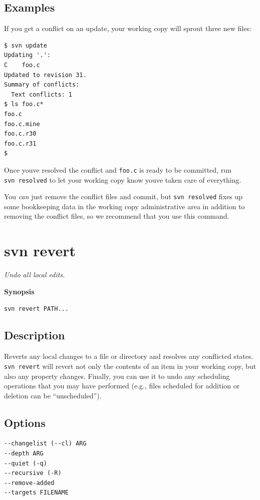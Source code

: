 \subsection{Examples}

If you get a conflict on an update, your working copy will sprout three
new files:

\begin{verbatim}
$ svn update
Updating '.':
C    foo.c
Updated to revision 31.
Summary of conflicts:
  Text conflicts: 1
$ ls foo.c*
foo.c
foo.c.mine
foo.c.r30
foo.c.r31
$
\end{verbatim}

Once you\textquotesingle ve resolved the conflict and \texttt{foo.c} is
ready to be committed, run \texttt{svn\ resolved} to let your working
copy know you\textquotesingle ve taken care of everything.

You \emph{can} just remove the conflict files and commit, but
\texttt{svn\ resolved} fixes up some bookkeeping data in the working
copy administrative area in addition to removing the conflict files, so
we recommend that you use this command.

\section{svn revert}\label{svn.ref.svn.c.revert}

\emph{Undo all local edits.}

\textbf{Synopsis}

\texttt{svn\ revert\ PATH...}

\subsection{Description}

Reverts any local changes to a file or directory and resolves any
conflicted states. \texttt{svn\ revert} will revert not only the
contents of an item in your working copy, but also any property changes.
Finally, you can use it to undo any scheduling operations that you may
have performed (e.g., files scheduled for addition or deletion can be
``unscheduled'').

\subsection{Options}

\begin{verbatim}
--changelist (--cl) ARG
--depth ARG
--quiet (-q)
--recursive (-R)
--remove-added
--targets FILENAME
\end{verbatim}

